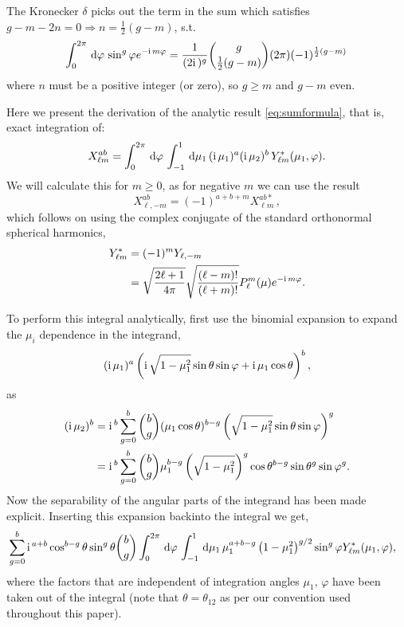 The Kronecker $\delta$ picks out the term in the sum which satisfies $g - m -2n =0 \Rightarrow n = \frac{1}{2}(g-m)$, s.t. 
\begin{equation}
	\int_0^{2\pi} \,\mathrm{d}\varphi\, \sin^g\varphi e^{-\mathrm{i\,} m \varphi} = \frac{1}{(2\mathrm{i\,})^g} \binom{g}{\frac{1}{2}(g-m)} (2\pi) (-1)^{\frac{1}{2}(g-m)}\,
\end{equation}
where $n$ must be a positive integer (or zero), so $g \geq m$ and $g -m$ even.



\iffalse

Here we present the derivation of the analytic result \ref{eq:sumformula}, that is, exact integration of:
\begin{equation} X_{\ell m}^{ab} = \int_0^{2\pi} \,\mathrm{d}\varphi\, \int_{-1}^1 \,\mathrm{d}\mu_1\, (\mathrm{i\,} \mu_1)^a (\mathrm{i\,} \mu_2)^b \,Y_{\ell m}^*(\mu_1,\varphi).
\end{equation}
We will calculate this for $m\geq0$, as for negative $m$ we can use the result
\begin{equation}
X_{\ell, -m}^{ab} = (-1)^{a+b+m} X_{\ell m}^{ab*}\,,
\end{equation}
which follows on using the complex conjugate of the standard orthonormal spherical harmonics,
\begin{align}
Y_{\ell m}^* &= (-1)^m Y_{\ell, -m} \nonumber\\
&= \sqrt{\frac{2 \ell + 1}{4 \pi}} \sqrt{\frac{(\ell - m )!}{(\ell + m )!}} P_\ell^m(\mu) e^{-\mathrm{i\,} m \varphi}.
\end{align}

To perform this integral analytically, first use the binomial expansion to expand the \(\mu_i\) dependence in the integrand, 
\begin{equation}
( \mathrm{i\,} \mu_1)^a \left(\mathrm{i\,} \sqrt{1-\mu_1^2} \sin\theta \sin\varphi + \mathrm{i\,} \mu_1 \cos\theta \right)^b,
\end{equation}
as
\begin{align}
(\mathrm{i\,} \mu_2)^b &= \mathrm{i\,}^b \sum_{g=0}^b \binom{b}{g} (\mu_1 \cos\theta)^{b-g} \left(\sqrt{1-\mu_1^2}\sin\theta \sin\varphi\right)^g \nonumber\\
& =\mathrm{i\,}^b \sum_{g=0}^b \binom{b}{g} \mu_1^{b-g} \left(\sqrt{1-\mu_1^2}\right)^g \cos\theta^{b-g} \sin\theta^g \sin\varphi^g. 
\end{align}
Now the separability of the angular parts of the integrand has been made explicit. Inserting this expansion backinto the integral we get, 
\begin{align}
&\sum_{g=0}^b \mathrm{i\,}^{a+b} \cos^{b-g}\theta \sin^g\theta \binom{b}{g} \int_0^{2\pi}\,\mathrm{d}\varphi\, \int_{-1}^1 \,\mathrm{d}\mu_1\, \mu_1^{a+b-g} \left(1-\mu_1^2\right)^{g/2} \sin^g\varphi Y_{\ell m}^*(\mu_1,\varphi),
\end{align}
where the factors that are independent of integration angles \(\mu_1,\,\varphi\) have been taken out of the integral (note that \(\theta = \theta_{12}\) as per our convention used throughout this paper). 

